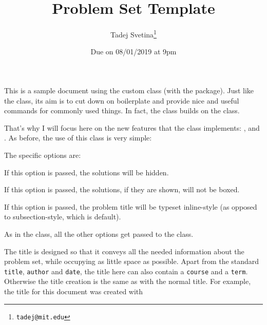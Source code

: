 \documentclass{pset}
\title{Problem Set Template}
\author{Tadej Svetina\thanks{\texttt{tadej@mit.edu}}}
\date{Due on 08/01/2019 at 9pm}
\theoremstyle{remark}
\begin{document}
\maketitle\reversemarginpar

This is a sample document using the custom  class (with the  package). Just like the  class, its aim is to cut down on boilerplate and provide nice and useful commands for commonly used things. In fact, the  class builds on the  class. 

That's why I will focus here on the new features that the  class implements: ,  and . As before, the use of this class is very simple:

The  specific options are:
\begin{description}[font=\ttfamily, labelindent=1em]
    \item[nosolutions] If this option is passed, the solutions will be hidden.
    \item[nobox] If this option is passed, the solutions, if they are shown, will not be boxed.
    \item[nline] If this option is passed, the problem title will be typeset inline-style (as opposed to subsection-style, which is default).
\end{description}
As in the  class, all the other options get passed to the  class.

The title is designed so that it conveys all the needed information about the problem set, while occupying as little space as possible. Apart from the standard \texttt{title}, \texttt{author} and \texttt{date}, the title here can also contain a \texttt{course} and a \texttt{term}. Otherwise the title creation is the same as with the normal title. For example, the title for this document was created with

\end{document}
